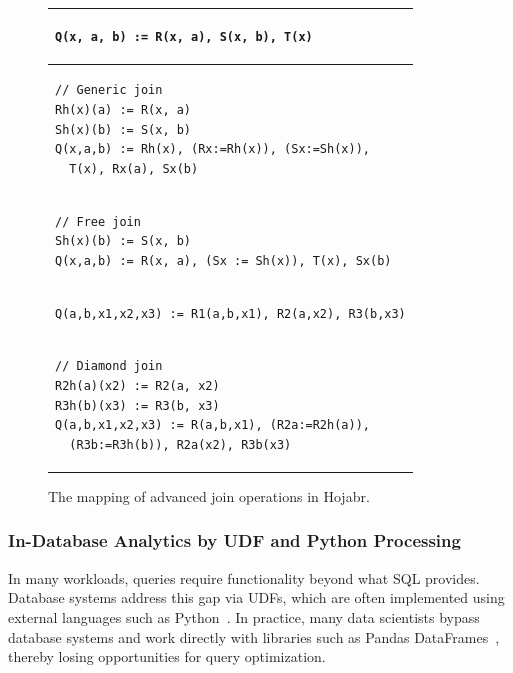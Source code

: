 \documentclass[sigconf,nonacm]{acmart}
\begin{document}
\begin{figure}[t!]
\begin{tabular}{|l|}
\hline 
\begin{lstlisting}
Q(x, a, b) := R(x, a), S(x, b), T(x)
\end{lstlisting} \\ \hline \hline
\begin{lstlisting}
// Generic join
Rh(x)(a) := R(x, a)
Sh(x)(b) := S(x, b)
Q(x,a,b) := Rh(x), (Rx:=Rh(x)), (Sx:=Sh(x)), 
  T(x), Rx(a), Sx(b)
\end{lstlisting} \\ \hline
\begin{lstlisting}
// Free join
Sh(x)(b) := S(x, b)
Q(x,a,b) := R(x, a), (Sx := Sh(x)), T(x), Sx(b)
\end{lstlisting}
\\ \hline 
\hline \hline
\begin{lstlisting}
Q(a,b,x1,x2,x3) := R1(a,b,x1), R2(a,x2), R3(b,x3)
\end{lstlisting} \\ \hline \hline
\begin{lstlisting}
// Diamond join
R2h(a)(x2) := R2(a, x2)
R3h(b)(x3) := R3(b, x3)
Q(a,b,x1,x2,x3) := R(a,b,x1), (R2a:=R2h(a)), 
  (R3b:=R3h(b)), R2a(x2), R3b(x3)
\end{lstlisting} \\ \hline
\end{tabular}
\caption{The mapping of advanced join operations in Hojabr.}
\label{fig:advjoin}
\end{figure}


\subsubsection{In-Database Analytics by UDF and Python Processing} 
In many workloads, queries require functionality beyond what SQL provides. Database systems address this gap via UDFs, which are often implemented using external languages such as Python~\cite{foufoulas2023efficient}. In practice, many data scientists bypass database systems and work directly with libraries such as Pandas DataFrames~\cite{pandas}, thereby losing opportunities for query optimization.
\end{document}
